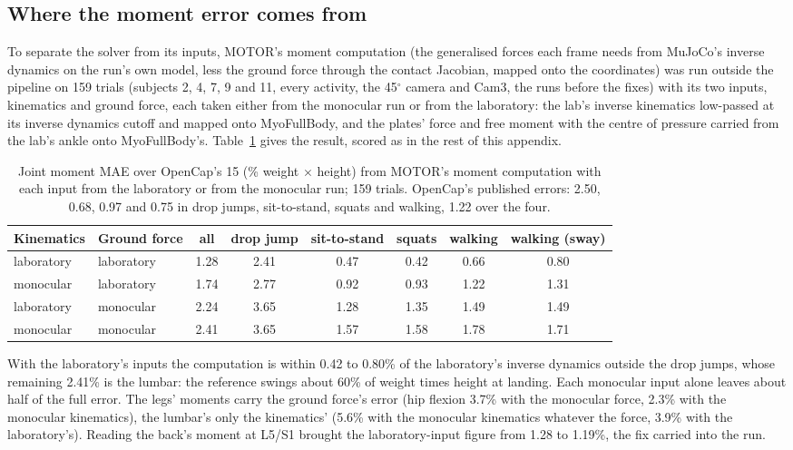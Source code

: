 \documentclass[11pt]{article}
\newcommand{\dg}{\ensuremath{^\circ}}
\begin{document}
\subsection{Where the moment error comes from}
\label{app:moments}
To separate the solver from its inputs, MOTOR's moment computation (the generalised forces each frame needs from
MuJoCo's inverse dynamics on the run's own model, less the ground force through the contact Jacobian, mapped onto the
coordinates) was run outside the pipeline on 159 trials (subjects 2, 4, 7, 9 and 11, every activity, the 45\dg{} camera
and Cam3, the runs before the fixes) with its two inputs, kinematics and ground force, each taken either from the
monocular run or from the laboratory: the lab's inverse kinematics low-passed at its inverse dynamics cutoff and
mapped onto MyoFullBody, and the plates' force and free moment with the centre of pressure carried from the lab's
ankle onto MyoFullBody's. Table~\ref{tab:moments-inputs} gives the result, scored as in the rest of this appendix.
\begin{table}[h]
\centering\small
\caption{Joint moment MAE over OpenCap's 15 (\% weight $\times$ height) from MOTOR's moment computation with each
input from the laboratory or from the monocular run; 159 trials. OpenCap's published errors: 2.50, 0.68, 0.97 and
0.75 in drop jumps, sit-to-stand, squats and walking, 1.22 over the four.}
\label{tab:moments-inputs}
\begin{tabular}{@{}llcccccc@{}}
\toprule
Kinematics & Ground force & all & drop jump & sit-to-stand & squats & walking & walking (sway) \\
\midrule
laboratory & laboratory & 1.28 & 2.41 & 0.47 & 0.42 & 0.66 & 0.80 \\
monocular & laboratory & 1.74 & 2.77 & 0.92 & 0.93 & 1.22 & 1.31 \\
laboratory & monocular & 2.24 & 3.65 & 1.28 & 1.35 & 1.49 & 1.49 \\
monocular & monocular & 2.41 & 3.65 & 1.57 & 1.58 & 1.78 & 1.71 \\
\bottomrule
\end{tabular}
\end{table}
With the laboratory's inputs the computation is within 0.42 to 0.80\% of the laboratory's inverse dynamics outside
the drop jumps, whose remaining 2.41\% is the lumbar: the reference swings about 60\% of weight times height at
landing. Each monocular input alone leaves about half of the full error. The legs' moments carry the ground force's
error (hip flexion 3.7\% with the monocular force, 2.3\% with the monocular kinematics), the lumbar's only the
kinematics' (5.6\% with the monocular kinematics whatever the force, 3.9\% with the laboratory's). Reading the
back's moment at L5/S1 brought the laboratory-input figure from 1.28 to 1.19\%, the fix carried into the run.
\end{document}
